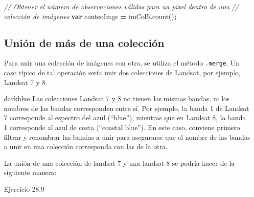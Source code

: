 \documentclass[
  12pt,
  letterpaper,
  twoside]{book}
\newenvironment{Shaded}{\begin{snugshade}}{\end{snugshade}}
\newcommand{\CommentTok}[1]{\textcolor[rgb]{0.56,0.35,0.01}{\textit{#1}}}
\newcommand{\FunctionTok}[1]{\textcolor[rgb]{0.00,0.00,0.00}{#1}}
\newcommand{\KeywordTok}[1]{\textcolor[rgb]{0.13,0.29,0.53}{\textbf{#1}}}
\newcommand{\NormalTok}[1]{#1}
\newcommand{\OperatorTok}[1]{\textcolor[rgb]{0.81,0.36,0.00}{\textbf{#1}}}
\begin{document}
\begin{Shaded}
\begin{Highlighting}[]
\CommentTok{// Obtener el número de observaciones válidas para un píxel dentro de una }
\CommentTok{// colección de imágenes}
\KeywordTok{var}\NormalTok{ conteoImgs }\OperatorTok{=}\NormalTok{ imCol5}\OperatorTok{.}\FunctionTok{count}\NormalTok{()}\OperatorTok{;}
\end{Highlighting}
\end{Shaded}

\hypertarget{uniuxf3n-de-muxe1s-de-una-colecciuxf3n}{%
\subsection{Unión de más de una colección}\label{uniuxf3n-de-muxe1s-de-una-colecciuxf3n}}

Para unir una colección de imágenes con otra, se utiliza el método \texttt{.merge}. Un caso típico de tal operación sería unir dos colecciones de Landsat, por ejemplo, Landsat 7 y 8.

\begin{bluebox2}

\begin{awesomeblock}{5pt}{\faLightbulb}{darkblue}
Las colecciones Landsat 7 y 8 no tienen las mismas bandas, ni los nombres de las bandas corresponden entre sí. Por ejemplo, la banda 1 de Landsat 7 corresponde al espectro del azul (``blue''), mientras que en Landsat 8, la banda 1 corresponde al azul de costa (``coastal blue''). En este caso, conviene primero filtrar y renombrar las bandas a unir para asegurarse que el nombre de las bandas a unir en una colección corresponda con las de la otra.

\end{awesomeblock}

\end{bluebox2}

La unión de una colección de landsat 7 y una landsat 8 se podría hacer de la siguiente manera:

Ejercicio 28.9
\end{document}
